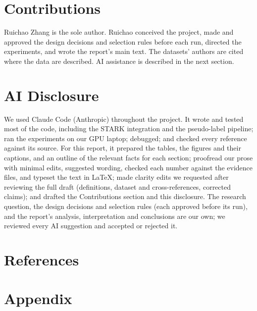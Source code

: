 \documentclass{article}
\begin{document}
\section{Contributions}
Ruichao Zhang is the sole author. Ruichao conceived the project, made and approved the design decisions and selection
rules before each run, directed the experiments, and wrote the report's main text. The datasets' authors are cited
where the data are described. AI assistance is described in the next section.

\section{AI Disclosure}
We used Claude Code (Anthropic) throughout the project. It wrote and tested most of the code, including the STARK
integration and the pseudo-label pipeline; ran the experiments on our GPU laptop; debugged; and checked every reference
against its source. For this report, it prepared the tables, the figures and their captions, and an outline of the
relevant facts for each section; proofread our prose with minimal edits, suggested wording, checked each number
against the evidence files, and typeset the text in LaTeX; made clarity edits we requested after reviewing the full
draft (definitions, dataset and cross-references, corrected claims); and drafted the Contributions section and this
disclosure. The research question, the design decisions and selection rules (each approved before its run), and the
report's analysis, interpretation and conclusions are our own; we reviewed every AI suggestion and accepted or
rejected it.

\section*{References}
\renewcommand{\bibsection}{}   %
\medskip
{\small


}

\appendix
\section{Appendix}
\label{sec:appendix}
\end{document}
